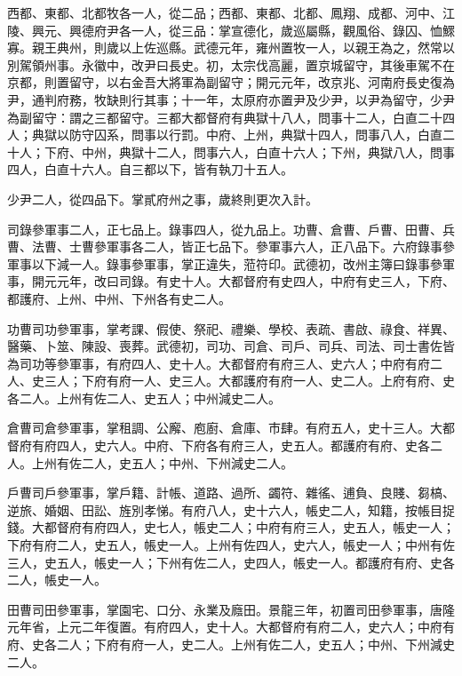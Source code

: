 \begin{pinyinscope}
 西都、東都、北都牧各一人，從二品；西都、東都、北都、鳳翔、成都、河中、江陵、興元、興德府尹各一人，從三品：掌宣德化，歲巡屬縣，觀風俗、錄囚、恤鰥寡。親王典州，則歲以上佐巡縣。武德元年，雍州置牧一人，以親王為之，然常以別駕領州事。永徽中，改尹曰長史。初，太宗伐高麗，置京城留守，其後車駕不在京都，則置留守，以右金吾大將軍為副留守；開元元年，改京兆、河南府長史復為尹，通判府務，牧缺則行其事；十一年，太原府亦置尹及少尹，以尹為留守，少尹為副留守：謂之三都留守。三都大都督府有典獄十八人，問事十二人，白直二十四人；典獄以防守囚系，問事以行罰。中府、上州，典獄十四人，問事八人，白直二十人；下府、中州，典獄十二人，問事六人，白直十六人；下州，典獄八人，問事四人，白直十六人。自三都以下，皆有執刀十五人。



 少尹二人，從四品下。掌貳府州之事，歲終則更次入計。



 司錄參軍事二人，正七品上。錄事四人，從九品上。功曹、倉曹、戶曹、田曹、兵曹、法曹、士曹參軍事各二人，皆正七品下。參軍事六人，正八品下。六府錄事參軍事以下減一人。錄事參軍事，掌正違失，蒞符印。武德初，改州主簿曰錄事參軍事，開元元年，改曰司錄。有史十人。大都督府有史四人，中府有史三人，下府、都護府、上州、中州、下州各有史二人。



 功曹司功參軍事，掌考課、假使、祭祀、禮樂、學校、表疏、書啟、祿食、祥異、醫藥、卜筮、陳設、喪葬。武德初，司功、司倉、司戶、司兵、司法、司士書佐皆為司功等參軍事，有府四人、史十人。大都督府有府三人、史六人；中府有府二人、史三人；下府有府一人、史三人。大都護府有府一人、史二人。上府有府、史各二人。上州有佐二人、史五人；中州減史二人。



 倉曹司倉參軍事，掌租調、公廨、庖廚、倉庫、市肆。有府五人，史十三人。大都督府有府四人，史六人。中府、下府各有府三人，史五人。都護府有府、史各二人。上州有佐二人，史五人；中州、下州減史二人。



 戶曹司戶參軍事，掌戶籍、計帳、道路、過所、蠲符、雜徭、逋負、良賤、芻槁、逆旅、婚姻、田訟、旌別孝悌。有府八人，史十六人，帳史二人，知籍，按帳目捉錢。大都督府有府四人，史七人，帳史二人；中府有府三人，史五人，帳史一人；下府有府二人，史五人，帳史一人。上州有佐四人，史六人，帳史一人；中州有佐三人，史五人，帳史一人；下州有佐二人，史四人，帳史一人。都護府有府、史各二人，帳史一人。



 田曹司田參軍事，掌園宅、口分、永業及廕田。景龍三年，初置司田參軍事，唐隆元年省，上元二年復置。有府四人，史十人。大都督府有府二人，史六人；中府有府、史各二人；下府有府一人，史二人。上州有佐二人，史五人；中州、下州減史二人。




\end{pinyinscope}

